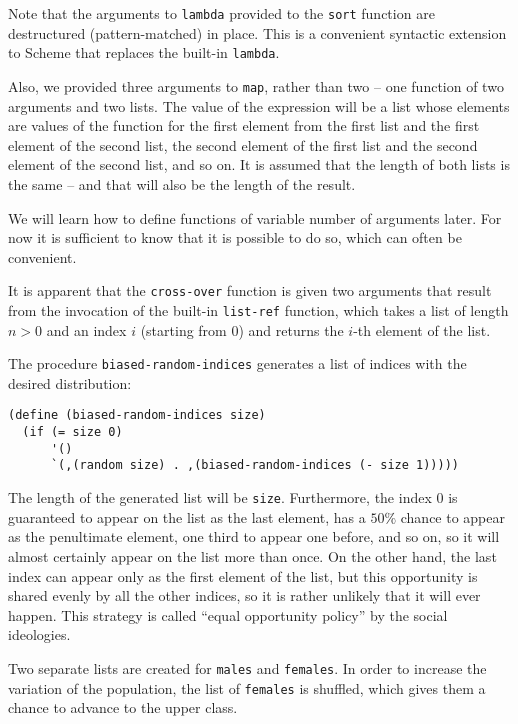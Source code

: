 Note that the arguments to \texttt{lambda} provided to the \texttt{sort}
function are destructured (pattern-matched) in place. This is a convenient
syntactic extension to Scheme that replaces the built-in \texttt{lambda}.

Also, we provided three arguments to \texttt{map}, rather than two
-- one function of two arguments and two lists. The value of the expression
will be a list whose elements are values of the function for the first element
from the first list and the first element of the second list, the
second element of the first list and the second element of the second
list, and so on. It is assumed that the length of both lists is the
same -- and that will also be the length of the result.

We will learn how to define functions of variable number of arguments
later. For now it is sufficient to know that it is possible to do so,
which can often be convenient.

It is apparent that the \texttt{cross-over} function is given two
arguments that result from the invocation of the built-in \texttt{list-ref}
function, which takes a list of length $n>0$ and an index $i$ (starting
from $0$) and returns the $i$-th element of the list.

The procedure \texttt{biased-random-indices} generates a list of
indices with the desired distribution:

\begin{Verbatim}[samepage=true]
(define (biased-random-indices size)
  (if (= size 0)
      '()
      `(,(random size) . ,(biased-random-indices (- size 1)))))
\end{Verbatim}

The length of the generated list will be \texttt{size}.
Furthermore, the index $0$ is guaranteed to appear on the list
as the last element, has a $50\%$ chance to appear as the
penultimate element, one third to appear one before, and so
on, so it will almost certainly appear on the list more than
once. On the other hand, the last index can appear only
as the first element of the list, but this opportunity
is shared evenly by all the other indices, so it is rather
unlikely that it will ever happen. This strategy is called
``equal opportunity policy'' by the social ideologies.

Two separate lists are created for \texttt{males}
and \texttt{females}. In order to increase the variation
of the population, the list of \texttt{females} is shuffled,
which gives them a chance to advance to the upper class.

